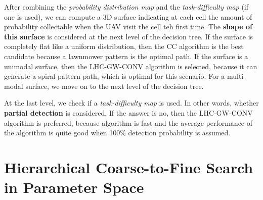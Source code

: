 After combining the \textit{probability distribution map} and the \textit{task-difficulty map} (if one is used), we can compute a 3D surface indicating at each cell the amount of probability collectable when the UAV visit the cell teh first time. The \textbf{shape of this surface} is considered at the next level of the decision tree. If the surface is completely flat like a uniform distribution, then the CC algorithm is the best candidate because a lawnmower pattern is the optimal path. If the surface is a unimodal surface, then the LHC-GW-CONV algorithm is selected, because it can generate a spiral-pattern path, which is optimal for this scenario. For a multi-modal surface, we move on to the next level of the decision tree.

At the last level, we check if a \textit{task-difficulty map} is used. In other words, whether \textbf{partial detection} is considered. If the answer is no, then the LHC-GW-CONV algorithm is preferred, because algorithm is fast and the average performance of the algorithm is quite good when 100\% detection probability is assumed.













\section{Hierarchical Coarse-to-Fine Search in Parameter Space}
\label{Decision}
